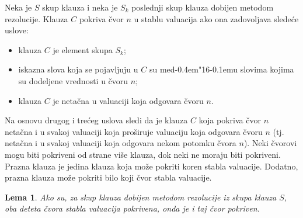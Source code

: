 \documentclass[12pt, a4paper, titlepage, twoside]{article}
\newtheorem{lemma}[theorem]{Lema}
\theoremstyle{definition}
\def\dj{d\kern-0.4em\char"16\kern-0.1em}
\begin{document}
Neka je $S$ skup klauza i neka je $S_k$ poslednji skup klauza dobijen metodom
rezolucije. Klauza $C$ pokriva \v cvor $n$ u stablu valuacija ako ona zadovoljava
slede\'ce uslove:
\begin{itemize}
	\item klauza $C$ je element skupa $S_k$;
	\item iskazna slova koja se pojavljuju u $C$ su me\dj{}u slovima kojima su dodeljene
vrednosti u \v cvoru $n$;
	\item klauza $C$ je neta\v cna u valuaciji koja odgovara \v cvoru $n$.
\end{itemize}


Na osnovu drugog i tre\'ceg uslova sledi da je klauza $C$ koja pokriva \v cvor
$n$ neta\v cna i u svakoj valuaciji koja pro\v siruje valuaciju koja odgovara \v cvoru $n$
(tj. neta\v cna i u svakoj valuaciji koja odgovara nekom potomku \v cvora $n$). Neki
\v cvorovi mogu biti pokriveni od strane vi\v se klauza, dok neki ne moraju biti
pokriveni. Prazna klauza je jedina klauza koja mo\v ze pokriti koren stabla valuacije.
Dodatno, prazna klauza mo\v ze pokriti bilo koji \v cvor stabla valuacije.

\vspace{0.2cm}
\begin{lemma}
Ako su, za skup klauza dobijen metodom rezolucije iz skupa klauza
$S$, oba deteta \v cvora stabla valuacija pokrivena, onda je i taj \v cvor pokriven.
\end{lemma}
\end{document}
